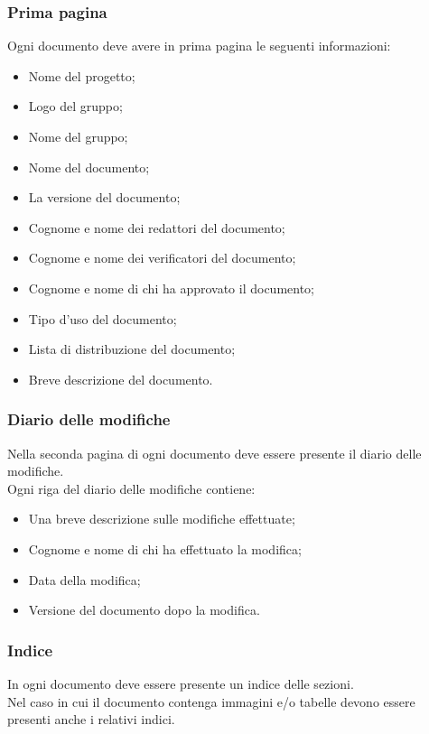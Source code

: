 \subsubsection{Prima pagina}
Ogni documento deve avere in prima pagina le seguenti informazioni:
\begin{itemize}
	\item Nome del progetto;
	\item Logo del gruppo;
	\item Nome del gruppo;
	\item Nome del documento;
	\item La versione del documento;
	\item Cognome e nome dei redattori del documento;
	\item Cognome e nome dei verificatori del documento;
	\item Cognome e nome di chi ha approvato il documento;
	\item Tipo d'uso del documento;
	\item Lista di distribuzione del documento;
	\item Breve descrizione del documento.
\end{itemize}
\subsubsection{Diario delle modifiche}
Nella seconda pagina di ogni documento deve essere presente il diario delle modifiche.\\
Ogni riga del diario delle modifiche contiene:
\begin{itemize}
	\item Una breve descrizione sulle modifiche effettuate;
	\item Cognome e nome di chi ha effettuato la modifica;
	\item Data della modifica;
	\item Versione del documento dopo la modifica.
\end{itemize}

\subsubsection{Indice}
In ogni documento deve essere presente un indice delle sezioni.\\
Nel caso in cui il documento contenga immagini e/o tabelle devono essere presenti anche i relativi indici.

